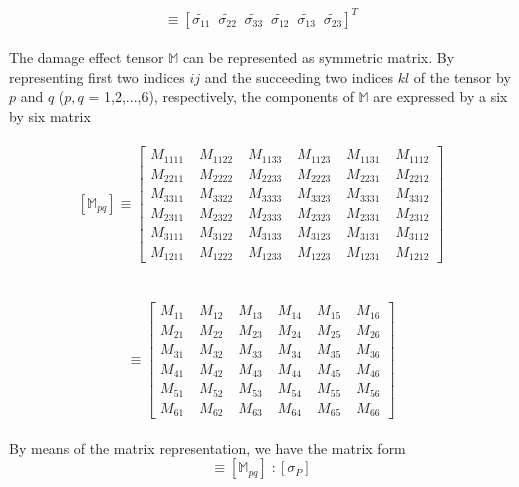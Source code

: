 \documentclass[a4paper,12pt]{article}
\begin{document}
\begin{equation}
   [\tilde{\sigma_{P}}]  \equiv  [\tilde{\sigma_{11}} \;\; \tilde{\sigma_{22}} \;\;\tilde{\sigma_{33}} \;\;\tilde{\sigma_{12}} \;\;\tilde{\sigma_{13}} \;\;\tilde{\sigma_{23}} ]^{T}
\end{equation}
\\
The damage effect tensor $\mathbb{M}$ can be represented as symmetric matrix. By representing first two indices $ij$ and the succeeding two indices $kl$ of the tensor by $p$ and $q$ ($p,q$ = 1,2,...,6), respectively, the components of $\mathbb{M}$
are expressed by a six by six matrix 
\\
\\
$$
[\mathbb{M}_{pq}] \equiv   
 \begin{bmatrix}
  M_{1111}\; & M_{1122}\; & M_{1133}\; & M_{1123}\; & M_{1131}\; & M_{1112} \\
  M_{2211}\; & M_{2222}\; & M_{2233}\; & M_{2223}\; & M_{2231}\; & M_{2212} \\
  M_{3311}\; & M_{3322}\; & M_{3333}\; & M_{3323}\; & M_{3331}\; & M_{3312} \\
  M_{2311}\; & M_{2322}\; & M_{2333}\; & M_{2323}\; & M_{2331}\; & M_{2312} \\
  M_{3111}\; & M_{3122}\; & M_{3133}\; & M_{3123}\; & M_{3131}\; & M_{3112} \\
  M_{1211}\; & M_{1222}\; & M_{1233}\; & M_{1223}\; & M_{1231}\; & M_{1212}  
 \end{bmatrix}
 $$
 \\
 \\
$$
 \equiv   
 \begin{bmatrix}
  M_{11}\; & M_{12}\; & M_{13}\; & M_{14}\; & M_{15}\; & M_{16} \\
  M_{21}\; & M_{22}\; & M_{23}\; & M_{24}\; & M_{25}\; & M_{26} \\
  M_{31}\; & M_{32}\; & M_{33}\; & M_{34}\; & M_{35}\; & M_{36} \\
  M_{41}\; & M_{42}\; & M_{43}\; & M_{44}\; & M_{45}\; & M_{46} \\
  M_{51}\; & M_{52}\; & M_{53}\; & M_{54}\; & M_{55}\; & M_{56} \\
  M_{61}\; & M_{62}\; & M_{63}\; & M_{64}\; & M_{65}\; & M_{66}  
 \end{bmatrix}
 $$
\\
By means of the matrix representation, we have the matrix form
\begin{equation}
[\tilde{\sigma_{P}}] \equiv [\mathbb{M}_{pq}]\;: [\sigma_{P}]
\end{equation}
\end{document}
